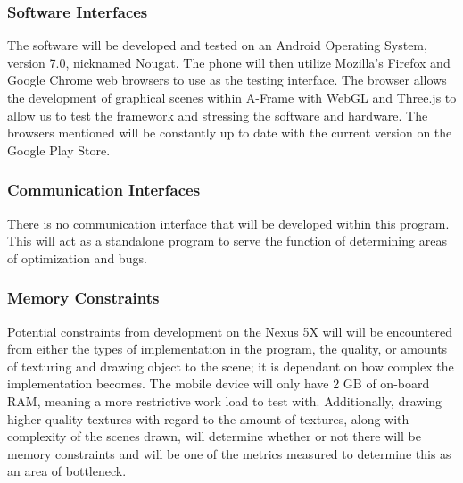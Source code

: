 \documentclass[letterpaper,10pt,titlepage,draftclsnofoot,onecolumn,compsoc,utf8,latin1]{IEEEtran}
\begin{document}
\begin{singlespace}
\subsubsection{Software Interfaces}
\begin{singlespace}
\noindent
The software will be developed and tested on an Android Operating System, version 7.0, nicknamed Nougat. The phone will then utilize Mozilla's Firefox and Google Chrome web browsers to use as the testing interface. The browser allows the development of graphical scenes within A-Frame with WebGL and Three.js to allow us to test the framework and stressing the software and hardware. The browsers mentioned will be constantly up to date with the current version on the Google Play Store.
\end{singlespace}

\subsubsection{Communication Interfaces}
\begin{singlespace}
\noindent
There is no communication interface that will be developed within this program. This will act as a standalone program to serve the function of determining areas of optimization and bugs.
\end{singlespace}

\subsubsection{Memory Constraints}
\begin{singlespace}
\noindent
Potential constraints from development on the Nexus 5X will will be encountered from either the types of implementation in the program, the quality, or amounts of texturing and drawing object to the scene; it is dependant on how complex the implementation becomes. The mobile device will only have 2 GB of on-board RAM, meaning a more restrictive work load to test with. Additionally, drawing higher-quality textures with regard to the amount of textures, along with complexity of the scenes drawn, will determine whether or not there will be memory constraints and will be one of the metrics measured to determine this as an area of bottleneck.
\end{singlespace}

\end{singlespace}
\end{document}
